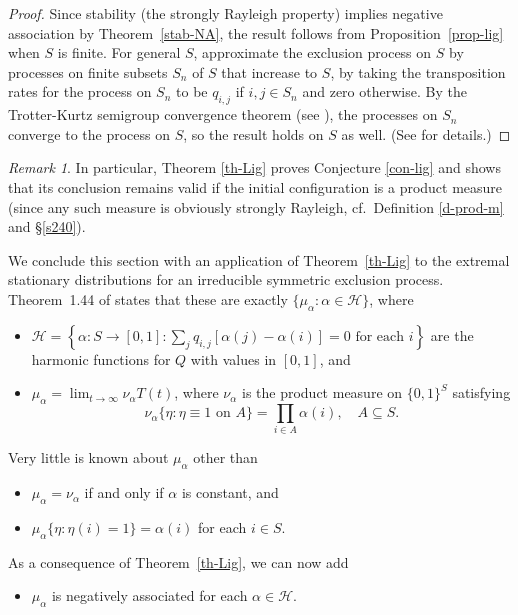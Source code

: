 \documentclass[10pt,reqno]{amsart}
\theoremstyle{plain}
\theoremstyle{definition}
\theoremstyle{remark}
\newtheorem{remark}{Remark}[section]
\begin{document}
\begin{proof} 
Since stability (the strongly Rayleigh property) implies
negative association by Theorem~\ref{stab-NA}, the result follows from 
Proposition~\ref{prop-lig} when $S$ is finite. 
For general $S$, approximate the exclusion process on $S$ by processes on 
finite subsets $S_n$ of
$S$ that increase to $S$, by taking the transposition rates for the process 
on $S_n$ to be $q_{i,j}$ if
$i,j\in S_n$ and zero otherwise. By the Trotter-Kurtz semigroup convergence 
theorem (see \cite[p.~28]{EK}), the
processes on $S_n$ converge to the process on $S$, so the result holds on 
$S$ as well. (See \cite[\S I.3]{L0} for details.) 
\end{proof}

\begin{remark}\label{prod-meas}
In particular, Theorem \ref{th-Lig} proves Conjecture \ref{con-lig} and shows 
that its conclusion remains valid if the initial configuration is a 
product measure (since any such measure is obviously strongly Rayleigh, 
cf.~Definition \ref{d-prod-m} and \S \ref{s240}).
\end{remark}

We conclude this section with an application of Theorem~\ref{th-Lig} 
to the extremal stationary
distributions for an irreducible
symmetric exclusion process. Theorem~1.44 of \cite[Chap.~VIII]{L0} states
that these
are exactly $\{\mu_{\alpha}:\alpha\in \mathcal{H}\}$, where 
\begin{itemize}
\item[(a)] $\mathcal{H}=\left\{\alpha:S\rightarrow [0,1] : 
\sum_jq_{i,j}[\alpha(j)-\alpha(i)]=0\text{ for each }i\right\}$ are the
harmonic functions for $Q$ with values in $[0,1]$, and 
\item[(b)] $\mu_{\alpha}=\lim_{t\rightarrow\infty}\nu_{\alpha}T(t)$, 
where $\nu_{\alpha}$ is the product measure on $\{0,1\}^S$ satisfying 
$$\nu_{\alpha}\{\eta:\eta\equiv 1\text{ on }A\}=\prod_{i\in A}\alpha(i),\quad
A\subseteq S.$$
\end{itemize} 
Very little is known about $\mu_{\alpha}$ other than 
\begin{itemize}
\item[(I)] 
$\mu_{\alpha}=\nu_{\alpha}$ if and only if $\alpha$ is constant, and 
\item[(II)] 
$\mu_{\alpha}\{\eta:\eta(i)=1\}=\alpha(i)$ for each $i\in S$. 
\end{itemize}
As a consequence of Theorem~\ref{th-Lig}, we can now add
\begin{itemize}
\item[(III)] 
$\mu_{\alpha}$ is negatively associated for each $\alpha\in\mathcal{H}$. 
\end{itemize}
\end{document}
